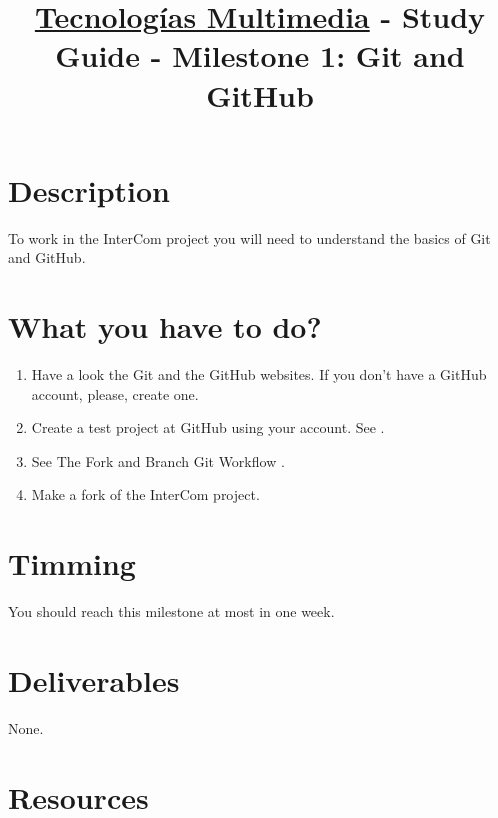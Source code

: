 \title{\href{https://www.ual.es/estudios/grados/presentacion/plandeestudios/asignatura/4015/40154321?idioma=zh_CN}{Tecnologías Multimedia} - Study Guide - Milestone 1: Git and GitHub}

\maketitle

\section{Description}

To work in the InterCom project \cite{intercom} you will need to
understand the basics of Git and GitHub.

\section{What you have to do?}

\begin{enumerate}
\item Have a look the Git \cite{Git, Git-book} and the GitHub
  \cite{GitHub} websites. If you don't have a GitHub account, please,
  create one.
\item Create a test project at GitHub using your account. See
  \cite{GitHub-HW}.
\item See The Fork and Branch Git Workflow \cite{Git-workflow}.
\item Make a fork of the InterCom \cite{intercom} project. 
\end{enumerate}

\section{Timming}

You should reach this milestone at most in one week.

\section{Deliverables}

None.

\section{Resources}


